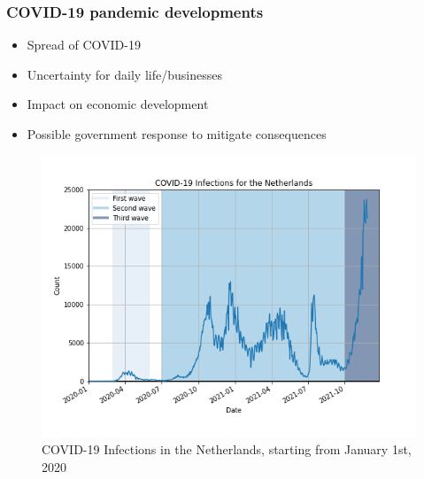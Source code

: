 \documentclass[aspectratio=169,classic]{uva-inf-presentation}
\begin{document}
\begin{frame}
\frametitle{COVID-19 pandemic developments}
\begin{itemize}
    \item Spread of COVID-19
    \item Uncertainty for daily life/businesses
    \item Impact on economic development
    \item Possible government response to mitigate consequences
\end{itemize}
\begin{figure}\centering
    \includegraphics[trim=0cm 1.5cm 0 -3cm, scale=0.4]{images/covid_19_infections_NL.png}
    \caption{COVID-19 Infections in the Netherlands, starting from January 1st, 2020}
\end{figure}
\end{frame}
\end{document}
